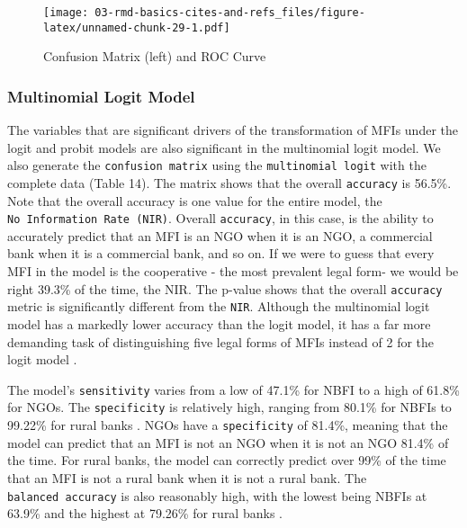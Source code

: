 \documentclass[a4paper,nobind]{templates/ociamthesis}
\begin{document}
\begin{landscape}
\begin{figure}
\centering
\texttt{[image: 03-rmd-basics-cites-and-refs\_files/figure-latex/unnamed-chunk-29-1.pdf]}
\caption{\label{fig:unnamed-chunk-29}Confusion Matrix (left) and ROC Curve}
\end{figure}

\newpage
\end{landscape}

\newpage

\hypertarget{multinomial-logit-model-1}{%
\subsubsection{Multinomial Logit Model}\label{multinomial-logit-model-1}}

The variables that are significant drivers of the transformation of MFIs under the logit and probit models are also significant in the multinomial logit model. We also generate the \texttt{confusion\ matrix} using the \texttt{multinomial\ logit} with the complete data (Table 14). The matrix shows that the overall \texttt{accuracy} is 56.5\%. Note that the overall accuracy is one value for the entire model, the \texttt{No\ Information\ Rate\ (NIR)}. Overall \texttt{accuracy}, in this case, is the ability to accurately predict that an MFI is an NGO when it is an NGO, a commercial bank when it is a commercial bank, and so on. If we were to guess that every MFI in the model is the cooperative - the most prevalent legal form- we would be right 39.3\% of the time, the NIR. The p-value shows that the overall \texttt{accuracy} metric is significantly different from the \texttt{NIR}. Although the multinomial logit model has a markedly lower accuracy than the logit model, it has a far more demanding task of distinguishing five legal forms of MFIs instead of 2 for the logit model \autocite{kwak2002multinomial}.

The model's \texttt{sensitivity} varies from a low of 47.1\% for NBFI to a high of 61.8\% for NGOs. The \texttt{specificity} is relatively high, ranging from 80.1\% for NBFIs to 99.22\% for rural banks \autocite{ginting2019hate}. NGOs have a \texttt{specificity} of 81.4\%, meaning that the model can predict that an MFI is not an NGO when it is not an NGO 81.4\% of the time. For rural banks, the model can correctly predict over 99\% of the time that an MFI is not a rural bank when it is not a rural bank. The \texttt{balanced\ accuracy} is also reasonably high, with the lowest being NBFIs at 63.9\% and the highest at 79.26\% for rural banks \autocite{hedeker2003mixed}.
\end{document}
